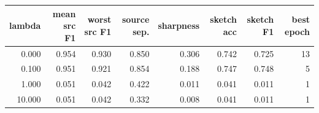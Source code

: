 \begin{tabular}{rrrrrrrr}
\toprule
lambda & mean src F1 & worst src F1 & source sep. & sharpness & sketch acc & sketch F1 & best epoch \\
\midrule
0.000 & 0.954 & 0.930 & 0.850 & 0.306 & 0.742 & 0.725 & 13 \\
0.100 & 0.951 & 0.921 & 0.854 & 0.188 & 0.747 & 0.748 & 5 \\
1.000 & 0.051 & 0.042 & 0.422 & 0.011 & 0.041 & 0.011 & 1 \\
10.000 & 0.051 & 0.042 & 0.332 & 0.008 & 0.041 & 0.011 & 1 \\
\bottomrule
\end{tabular}
